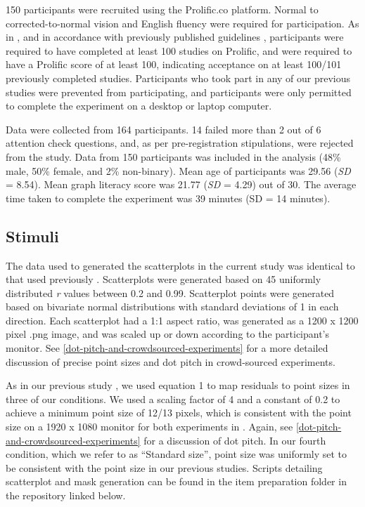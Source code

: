 \documentclass{vgtc}                          %
\begin{document}
150 participants were recruited using the Prolific.co platform. Normal to
corrected-to-normal vision and English fluency were required for participation. As in
\cite{strain_2023}, and in accordance with previously published guidelines \cite{peer_2021},
participants were required to have completed at least 100 studies on Prolific, and were
required to have a Prolific score of at least 100, indicating acceptance on at least
100/101 previously completed studies. Participants who took part in any of our
previous studies were prevented from participating, and participants were only
permitted to complete the experiment on a desktop or laptop computer.

Data were collected from 164 participants. 14 failed more than 2 out of 6 attention
check questions, and, as per pre-registration stipulations, were rejected from the study. Data
from 150 participants was included in the analysis (48\% male, 50\% female, and 2\% non-binary). Mean age of participants was 29.56 (\emph{SD} = 8.54). Mean graph literacy score was 21.77
(\emph{SD} = 4.29) out of 30. The average time taken to complete
the experiment was 39 minutes (SD = 14 minutes).

\hypertarget{stimuli}{%
\subsection{Stimuli}\label{stimuli}}

The data used to generated the scatterplots in the current study was identical to that
used previously \cite{strain_2023}. Scatterplots were generated based on 45 uniformly distributed \emph{r} values
between 0.2 and 0.99. Scatterplot points were generated based on bivariate normal
distributions with standard deviations of 1 in each direction. Each scatterplot
had a 1:1 aspect ratio, was generated as a 1200 x 1200 pixel .png image, and was
scaled up or down according to the participant's monitor. See \autoref{dot-pitch-and-crowdsourced-experiments}
for a more detailed discussion of precise point sizes and dot pitch in crowd-sourced
experiments.

As in our previous study \cite{strain_2023}, we used equation 1 to map residuals
to point sizes in three of our conditions. We used a scaling factor of 4 and a constant of 0.2 to achieve a
minimum point size of 12/13 pixels, which is consistent with the point size on
a 1920 x 1080 monitor for both experiments in \cite{strain_2023}. Again, see \autoref{dot-pitch-and-crowdsourced-experiments} for a discussion of dot pitch.
In our fourth condition, which we refer to as ``Standard size'', point size was uniformly
set to be consistent with the point size in our previous studies.
Scripts detailing scatterplot and mask generation can be found in the item
preparation folder in the repository linked below.
\end{document}
